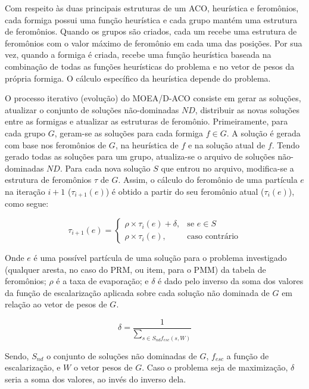Com respeito às duas principais estruturas de um ACO, heurística e feromônios, cada formiga possui uma função heurística e cada grupo mantém uma estrutura de feromônios. Quando os grupos são criados, cada um recebe uma estrutura de feromônios com o valor máximo de feromônio em cada uma das posições. Por sua vez, quando a formiga é criada, recebe uma função heurística baseada na combinação de todas as funções heurísticas do problema e no vetor de pesos da própria formiga. O cálculo específico da heurística depende do problema.

O processo iterativo (evolução) do MOEA/D-ACO consiste em gerar as soluções, atualizar o conjunto de soluções não-dominadas $ND$, distribuir as novas soluções entre as formigas e atualizar as estruturas de feromônio. Primeiramente, para cada grupo $G$, geram-se as soluções para cada formiga $f \in G$. A solução é gerada com base nos feromônios de $G$, na heurística de $f$ e na solução atual de $f$. Tendo gerado todas as soluções para um grupo, atualiza-se o arquivo de soluções não-dominadas $ND$. Para cada nova solução $S$ que entrou no arquivo, modifica-se a estrutura de feromônios $\tau$ de $G$. Assim, o cálculo do feromônio de uma partícula $e$ na iteração $i+1$ ($\tau_{i+1}(e)$) é obtido a partir do seu feromônio atual ($\tau_i(e)$), como segue:

\begin{equation}
\tau_{i+1}(e)= 
\begin{cases}
\rho \times \tau_i(e) + \delta,& \text{se } e \in S\\
\rho \times \tau_i(e),              & \text{caso contrário}
\end{cases}
\end{equation}

\vspace{4mm} %

Onde $e$ é uma possível partícula de uma solução para o problema investigado (qualquer aresta, no caso do PRM, ou item, para o PMM) da tabela de feromônios; $\rho$ é a taxa de evaporação; e $\delta$ é dado pelo inverso da soma dos valores da função de escalarização aplicada sobre cada solução não dominada de $G$ em relação ao vetor de pesos de $G$.

\begin{equation}\delta = \frac{1}{\sum_{s \in S_{nd}f_{esc}(s, W)}}\end{equation}
	
Sendo, $S_{nd}$ o conjunto de soluções não dominadas de $G$, $f_{esc}$ a função de escalarização, e $W$ o vetor pesos de $G$. Caso o problema seja de maximização, $\delta$ seria a soma dos valores, ao invés do inverso dela. 

